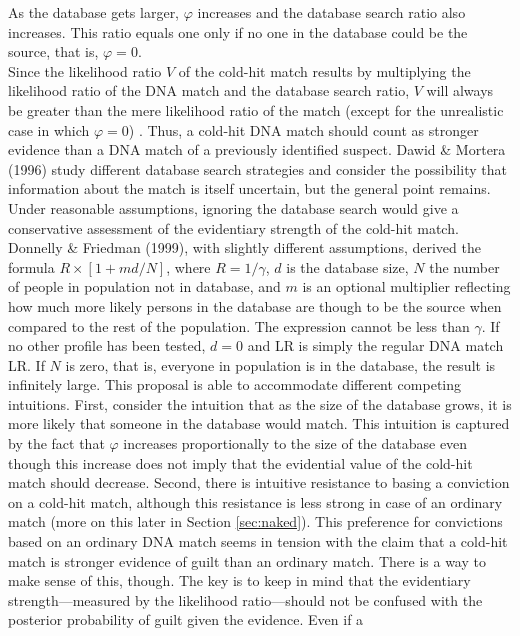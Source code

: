 \documentclass[10pt,dvipsnames,enabledeprecatedfontcommands]{scrartcl}
\begin{document}
\noindent As the database gets larger, \(\varphi\) increases and the
database search ratio also increases. This ratio equals one only if no
one in the database could be the source, that is, \(\varphi=0\).\\
Since the likelihood ratio \(V\) of the cold-hit match results by
multiplying the likelihood ratio of the DNA match and the database
search ratio, \(V\) will always be greater than the mere likelihood
ratio of the match (except for the unrealistic case in which
\(\varphi=0\)) . Thus, a cold-hit DNA match should count as stronger
evidence than a DNA match of a previously identified suspect. Dawid \&
Mortera (1996) study different database search strategies and consider
the possibility that information about the match is itself uncertain,
but the general point remains. Under reasonable assumptions, ignoring
the database search would give a conservative assessment of the
evidentiary strength of the cold-hit match. Donnelly \& Friedman (1999),
with slightly different assumptions, derived the formula
\(R \times [1+md/N]\), where \(R = 1/\gamma\), \(d\) is the database
size, \(N\) the number of people in population not in database, and
\(m\) is an optional multiplier reflecting how much more likely persons
in the database are though to be the source when compared to the rest of
the population. The expression cannot be less than \(\gamma\). If no
other profile has been tested, \(d=0\) and LR is simply the regular DNA
match LR. If \(N\) is zero, that is, everyone in population is in the
database, the result is infinitely large. This proposal is able to
accommodate different competing intuitions. First, consider the
intuition that as the size of the database grows, it is more likely that
someone in the database would match. This intuition is captured by the
fact that \(\varphi\) increases proportionally to the size of the
database even though this increase does not imply that the evidential
value of the cold-hit match should decrease. Second, there is intuitive
resistance to basing a conviction on a cold-hit match, although this
resistance is less strong in case of an ordinary match (more on this
later in Section \ref{sec:naked}). This
preference for convictions based on an ordinary DNA match seems in
tension with the claim that a cold-hit match is stronger evidence of
guilt than an ordinary match. There is a way to make sense of this,
though. The key is to keep in mind that the evidentiary
strength---measured by the likelihood ratio---should not be confused
with the posterior probability of guilt given the evidence. Even if a
\end{document}
